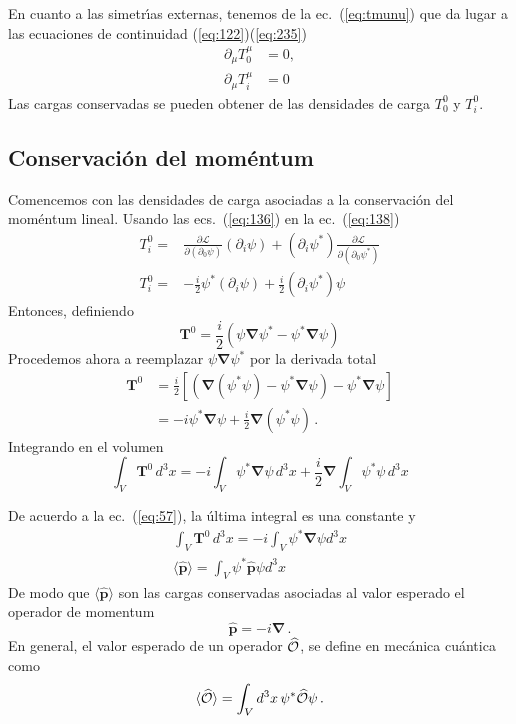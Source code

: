 \begin{subappendices}
En cuanto a las simetr\'\i as externas, tenemos de la ec.~(\ref{eq:tmunu}) que
da lugar a las ecuaciones de continuidad (\ref{eq:122})(\ref{eq:235})
\begin{align}
  \partial_\mu T^\mu_0&=0,\nonumber\\
\partial_\mu{T}^\mu_i&=0
\end{align}
Las cargas conservadas se pueden obtener de las densidades de carga
$T^0_0$ y $T^0_i$. 

\subsection{Conservación del moméntum}
Comencemos con las densidades de carga asociadas a
la conservación del moméntum lineal.
Usando  las ecs.~(\ref{eq:136}) en la ec.~(\ref{eq:138})
\begin{align}
  T^0_i=&\frac{\partial\mathcal{L}}{\partial(\partial_0\psi)}(\partial_i\psi)
  +(\partial_i\psi^*)\frac{\partial\mathcal{L}}{\partial(\partial_0\psi^*)}\nonumber\\
  T^0_i=&-\frac{i}{2}\psi^*(\partial_i\psi)+\frac{i}{2}(\partial_i\psi^*)\psi
\end{align}
Entonces, definiendo
\begin{equation}
   \mathbf{T}^0=\frac{i}{2}
  \left(
    \psi\boldsymbol{\nabla}\psi^*-\psi^*\boldsymbol{\nabla}\psi
  \right)
\end{equation}
Procedemos ahora a reemplazar $\psi\boldsymbol{\nabla}\psi^*$ por la
derivada total
\begin{align}
 \mathbf{T}^0&=\frac{i}{2}
  \left[\left( 
    \boldsymbol{\nabla}(\psi^*\psi)-\psi^*\boldsymbol{\nabla}\psi \right)-\psi^*\boldsymbol{\nabla}\psi
  \right]\nonumber\\
&=-i\psi^*\boldsymbol{\nabla}\psi+\frac{i}{2}\boldsymbol{\nabla}(\psi^*\psi)\,.
\end{align}
Integrando en el volumen
\begin{equation}
  \int_V \mathbf{T}^0\, d^3x=-i\int_V \psi^*\boldsymbol{\nabla}\psi\, d^3x+\frac{i}{2}\boldsymbol{\nabla}\int_V\psi^*\psi\,d^3x
\end{equation}
\begin{frame}
De acuerdo a la ec.~(\ref{eq:57}), la \'ultima integral es una constante y
\begin{align}
  \label{eq:140}
  \int_V \mathbf{T}^0\, d^3x=-i\int_V \psi^*\boldsymbol{\nabla}\psi d^3x\nonumber\\
\langle\widehat{\mathbf{p}}\rangle=\int_V \psi^*\widehat{\mathbf{p}}\psi d^3x
\end{align}
De modo que $\langle\widehat{\mathbf{p}}\rangle$ son las cargas conservadas asociadas al valor esperado el operador de momentum
\begin{equation}
  \widehat{\mathbf{p}}=-i\boldsymbol{\nabla}\,.
\end{equation}
En general, el valor esperado de un operador $ \widehat{\cal O}$, se define en mecánica cuántica como
\begin{align*}
  \langle\widehat{\cal O}\rangle=\int_V d^3x\,\psi^{*}\widehat{\cal O}\psi\,.
\end{align*}
\end{frame}

\end{subappendices}
